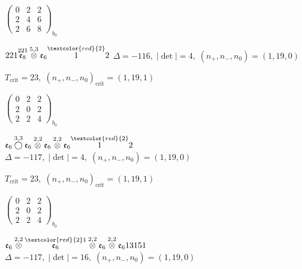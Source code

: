 \documentclass[10pt]{article}
\begin{document}
\hspace{2em}$\left(\begin{smallmatrix}0 & 2 & 2 \\ 2 & 4 & 6 \\ 2 & 6 & 8\end{smallmatrix}\right)_{\!b_0}$

\smallskip

$221\overset{221}{\mathfrak{e}_8}\overset{5,3}{\otimes}\mathfrak{e}_6\overset{\textcolor{red}{2}}{1}2$ \quad $\Delta=-116,\; |\det|=4,\; (n_+,n_-,n_0)=(1,19,0)$

\hspace{1em}$T_{\text{crit}}=23,\; (n_+,n_-,n_0)_{\text{crit}}=(1,19,1)$

\hspace{2em}$\left(\begin{smallmatrix}0 & 2 & 2 \\ 2 & 0 & 2 \\ 2 & 2 & 4\end{smallmatrix}\right)_{\!b_0}$

\smallskip

$\mathfrak{e}_6\overset{3,3}{\bigcirc}\mathfrak{e}_6\overset{2,2}{\otimes}\mathfrak{e}_6\overset{2,2}{\otimes}\mathfrak{e}_6\overset{\textcolor{red}{2}}{1}2$ \quad $\Delta=-117,\; |\det|=4,\; (n_+,n_-,n_0)=(1,19,0)$

\hspace{1em}$T_{\text{crit}}=23,\; (n_+,n_-,n_0)_{\text{crit}}=(1,19,1)$

\hspace{2em}$\left(\begin{smallmatrix}0 & 2 & 2 \\ 2 & 0 & 2 \\ 2 & 2 & 4\end{smallmatrix}\right)_{\!b_0}$

\smallskip

$\mathfrak{e}_6\overset{2,2}{\otimes}\overset{\textcolor{red}{2}1}{\mathfrak{e}_6}\overset{2,2}{\otimes}\mathfrak{e}_6\overset{2,2}{\otimes}\mathfrak{e}_613151$ \quad $\Delta=-117,\; |\det|=16,\; (n_+,n_-,n_0)=(1,19,0)$
\end{document}
